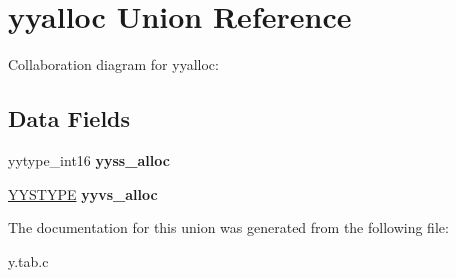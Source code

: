 \hypertarget{unionyyalloc}{}\section{yyalloc Union Reference}
\label{unionyyalloc}


Collaboration diagram for yyalloc\+:
\subsection*{Data Fields}
\begin{DoxyCompactItemize}
\item 
\mbox{\label{unionyyalloc_a26e6b311cc4eccee5ad7ac3840622b22}} 
yytype\+\_\+int16 {\bfseries yyss\+\_\+alloc}
\item 
\mbox{\label{unionyyalloc_a891efbd91c083d987c99bd4be8d06f50}} 
\hyperlink{union_y_y_s_t_y_p_e}{Y\+Y\+S\+T\+Y\+PE} {\bfseries yyvs\+\_\+alloc}
\end{DoxyCompactItemize}


The documentation for this union was generated from the following file\+:\begin{DoxyCompactItemize}
\item 
y.\+tab.\+c\end{DoxyCompactItemize}
